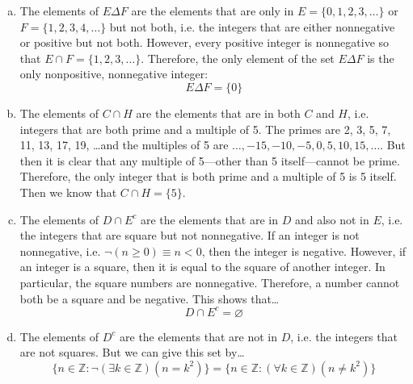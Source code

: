 \documentclass[11pt,letterpaper]{article}
\begin{document}
\begin{enumerate}[(a)]
\item The elements of $E \Delta F$ are the elements that are only in $E= \{ 0, 1, 2, 3, \ldots \}$ or $F= \{ 1, 2, 3, 4, \ldots \}$ but not both, i.e. the integers that are either nonnegative or positive but not both. However, every positive integer is nonnegative so that $E \cap F= \{ 1, 2, 3, \ldots \}$. Therefore, the only element of the set $E \Delta F$ is the only nonpositive, nonnegative integer:
	\[
	E \Delta F= \{ 0 \}
	\] \pspace

\item The elements of $C \cap H$ are the elements that are in both $C$ and $H$, i.e. integers that are both prime and a multiple of 5. The primes are 2, 3, 5, 7, 11, 13, 17, 19, \ldots and the multiples of 5 are $\ldots, -15, -10, -5, 0, 5, 10, 15, \ldots$. But then it is clear that any multiple of 5---other than 5 itself---cannot be prime. Therefore, the only integer that is both prime and a multiple of 5 is 5 itself. Then we know that $C \cap H= \{ 5 \}$. \pspace

\item The elements of $D \cap E^c$ are the elements that are in $D$ and also not in $E$, i.e. the integers that are square but not nonnegative. If an integer is not nonnegative, i.e. $\neg (n \geq 0) \equiv n < 0$, then the integer is negative. However, if an integer is a square, then it is equal to the square of another integer. In particular, the square numbers are nonnegative. Therefore, a number cannot both be a square and be negative. This shows that\dots
	\[
	D \cap E^c= \varnothing
	\] \pspace

\item The elements of $D^c$ are the elements that are not in $D$, i.e. the integers that are not squares. But we can give this set by\dots
	\[
	\{ n \in \mathbb{Z} \colon \neg(\exists k \in \mathbb{Z})(n= k^2) \}= \{ n \in \mathbb{Z} \colon (\forall k \in \mathbb{Z})(n \neq k^2) \}
	\]
\end{enumerate}
	
\end{document}
